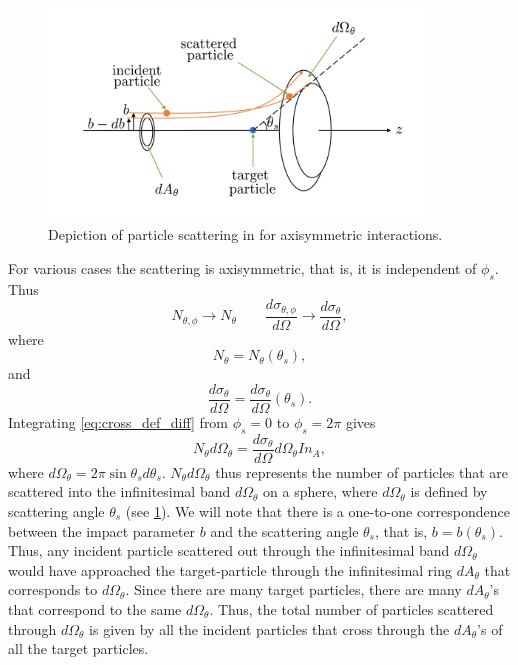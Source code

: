 \documentclass[a4paper,11pt]{report}
\begin{document}
\begin{figure}[ht]
    \centering
    \includegraphics[width=10cm]{../../images/scattering_axi.pdf}
    \caption{Depiction of particle scattering in for axisymmetric interactions.}
    \label{fig:scattering_axi}
\end{figure}
For various cases the scattering is axisymmetric, that is, it is independent of $\phi_s$. Thus
\begin{equation}
    N_{\theta, \phi} \to N_\theta \qquad \frac{d\sigma_{\theta,\phi}}{d\Omega} \to \frac{d\sigma_\theta}{d\Omega},
\end{equation}
where 
\begin{equation}
    N_\theta = N_\theta (\theta_s),
\end{equation}
and
\begin{equation}
    \frac{d\sigma_\theta}{d\Omega} = \frac{d\sigma_\theta}{d\Omega} (\theta_s).
\end{equation}
Integrating \cref{eq:cross_def_diff} from $\phi_s = 0$ to $\phi_s = 2\pi$ gives
\begin{equation}
    \label{eq:cross_def_diff_axi}
    N_\theta d\Omega_\theta = \frac{d\sigma_\theta}{d\Omega} d\Omega_\theta I n_A,
\end{equation}
where $d \Omega_\theta = 2\pi \sin \theta_s d\theta_s$. $N_\theta d\Omega_\theta$ thus represents the number of particles that are scattered into the infinitesimal band $d\Omega_\theta$ on a sphere, where $d\Omega_\theta$ is defined by scattering angle $\theta_s$ (see \cref{fig:scattering_axi}). We will note that there is a one-to-one correspondence between the impact parameter $b$ and the scattering angle $\theta_s$, that is, $b = b(\theta_s)$. Thus, any incident particle scattered out through the infinitesimal band $d\Omega_\theta$ would have approached the target-particle through the infinitesimal ring $dA_\theta$ that corresponds to $d\Omega_\theta$. Since there are many target particles, there are many $dA_\theta$'s that correspond to the same $d\Omega_\theta$. Thus, the total number of particles scattered through $d\Omega_\theta$ is given by all the incident particles that cross through the $dA_\theta$'s of all the target particles.
\end{document}

